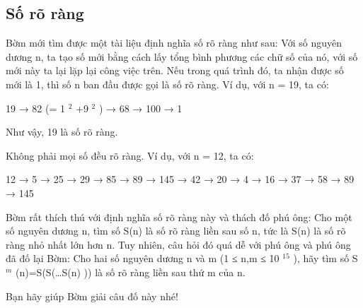\subsection{   Số rõ ràng  }

   Bờm mới tìm được một tài liệu định nghĩa số rõ ràng như sau: Với số nguyên dương n, ta tạo số mới bằng cách lấy tổng bình phương các chữ số của nó, với số mới này ta lại lặp lại công việc trên. Nếu trong quá trình đó, ta nhận được số mới là 1, thì số n ban đầu được gọi là số rõ ràng. Ví dụ, với n = 19, ta có:  

   19 → 82 (= 1   $^    2   $   +9   $^    2   $   ) → 68 → 100 → 1  

   Như vậy, 19 là số rõ ràng.  

   Không phải mọi số đều rõ ràng. Ví dụ, với n = 12, ta có:  

   12 → 5 → 25 → 29 → 85 → 89 → 145 → 42 → 20 → 4 → 16 → 37 → 58 → 89 → 145  

   Bờm rất thích thú với định nghĩa số rõ ràng này và thách đố phú ông: Cho một số nguyên dương n, tìm số S(n) là số rõ ràng liền sau số n, tức là S(n) là số rõ ràng nhỏ nhất lớn hơn n. Tuy nhiên, câu hỏi đó quá dễ với phú ông và phú ông đã đố lại Bờm: Cho hai số nguyên dương n và m (1 ≤ n,m ≤ 10   $^    15   $   ), hãy tìm số S   $^    m   $   (n)=S(S(…S(n) )) là số rõ ràng liền sau thứ m của n.  

   Bạn hãy giúp Bờm giải câu đố này nhé!